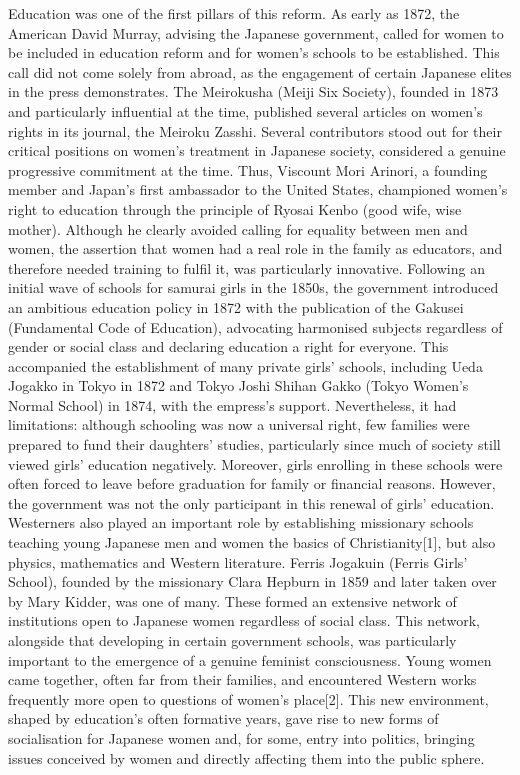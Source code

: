 \documentclass[11pt,a4paper]{article}
\begin{document}
Education was one of the first pillars of this reform. As early as 1872, the American David Murray, advising the Japanese government, called for women to be included in education reform and for women's schools to be established. This call did not come solely from abroad, as the engagement of certain Japanese elites in the press demonstrates. The Meirokusha (Meiji Six Society), founded in 1873 and particularly influential at the time, published several articles on women's rights in its journal, the Meiroku Zasshi. Several contributors stood out for their critical positions on women's treatment in Japanese society, considered a genuine progressive commitment at the time. Thus, Viscount Mori Arinori, a founding member and Japan's first ambassador to the United States, championed women's right to education through the principle of Ryosai Kenbo (good wife, wise mother). Although he clearly avoided calling for equality between men and women, the assertion that women had a real role in the family as educators, and therefore needed training to fulfil it, was particularly innovative. Following an initial wave of schools for samurai girls in the 1850s, the government introduced an ambitious education policy in 1872 with the publication of the Gakusei (Fundamental Code of Education), advocating harmonised subjects regardless of gender or social class and declaring education a right for everyone. This accompanied the establishment of many private girls' schools, including Ueda Jogakko in Tokyo in 1872 and Tokyo Joshi Shihan Gakko (Tokyo Women's Normal School) in 1874, with the empress's support. Nevertheless, it had limitations: although schooling was now a universal right, few families were prepared to fund their daughters' studies, particularly since much of society still viewed girls' education negatively. Moreover, girls enrolling in these schools were often forced to leave before graduation for family or financial reasons. However, the government was not the only participant in this renewal of girls' education. Westerners also played an important role by establishing missionary schools teaching young Japanese men and women the basics of Christianity{[}1{]}, but also physics, mathematics and Western literature. Ferris Jogakuin (Ferris Girls' School), founded by the missionary Clara Hepburn in 1859 and later taken over by Mary Kidder, was one of many. These formed an extensive network of institutions open to Japanese women regardless of social class. This network, alongside that developing in certain government schools, was particularly important to the emergence of a genuine feminist consciousness. Young women came together, often far from their families, and encountered Western works frequently more open to questions of women's place{[}2{]}. This new environment, shaped by education's often formative years, gave rise to new forms of socialisation for Japanese women and, for some, entry into politics, bringing issues conceived by women and directly affecting them into the public sphere.
\end{document}
